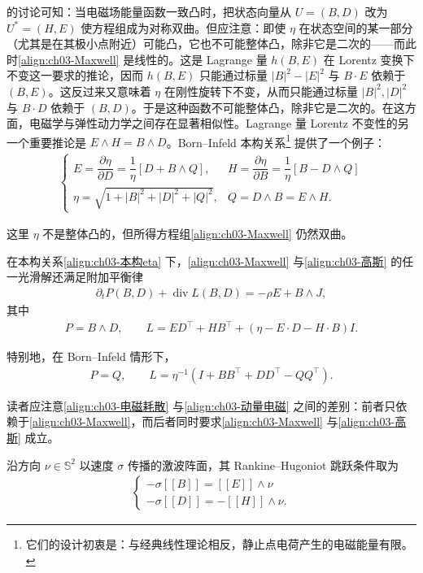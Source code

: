 ﻿\documentclass[../../main.tex]{subfiles}
\begin{document}
的讨论可知：当电磁场能量函数一致凸时，把状态向量从 $U=(B,D)$ 改为 $U^{*}=(H,E)$ 使方程组成为对称双曲。但应注意：即使 $\eta$ 在状态空间的某一部分（尤其是在其极小点附近）可能凸，它也不可能整体凸，除非它是二次的——而此时\eqref{align:ch03-Maxwell} 是线性的。这是 Lagrange 量 $h(B,E)$ 在 Lorentz 变换下不变这一要求的推论，因而 $h(B,E)$ 只能通过标量 $|B|^{2}-|E|^{2}$ 与 $B\cdot E$ 依赖于 $(B,E)$。这反过来又意味着 $\eta$ 在刚性旋转下不变，从而只能通过标量 $|B|^{2},|D|^{2}$ 与 $B\cdot D$ 依赖于 $(B,D)$。于是这种函数不可能整体凸，除非它是二次的。在这方面，电磁学与弹性动力学之间存在显著相似性。Lagrange 量 Lorentz 不变性的另一个重要推论是 $E\wedge H=B\wedge D$。Born--Infeld 本构关系\footnote{它们的设计初衷是：与经典线性理论相反，静止点电荷产生的电磁能量有限。} 提供了一个例子：
\begin{align}
\begin{cases}
E=\dfrac{\partial\eta}{\partial D}=\dfrac{1}{\eta}[D+B\wedge Q], & H=\dfrac{\partial\eta}{\partial B}=\dfrac{1}{\eta}[B-D\wedge Q]\\
\eta=\sqrt{1+|B|^{2}+|D|^{2}+|Q|^{2}}, & Q=D\wedge B=E\wedge H.
\end{cases}
\label{align:ch03-BornInfeld}
\end{align}

这里 $\eta$ 不是整体凸的，但所得方程组\eqref{align:ch03-Maxwell} 仍然双曲。

在本构关系\eqref{align:ch03-本构eta} 下，\eqref{align:ch03-Maxwell} 与\eqref{align:ch03-高斯} 的任一光滑解还满足附加平衡律
\begin{align}
\partial_{t}P(B,D)+\operatorname{div}L(B,D)=-\rho E+B\wedge J,
\label{align:ch03-动量电磁}
\end{align}
其中
\begin{align}
P=B\wedge D,\qquad L=ED^{\top}+HB^{\top}+(\eta-E\cdot D-H\cdot B)I.
\label{align:ch03-PL}
\end{align}

特别地，在 Born--Infeld 情形下，
\begin{align}
P=Q,\qquad L=\eta^{-1}\left(I+BB^{\top}+DD^{\top}-QQ^{\top}\right).
\label{align:ch03-BI-PL}
\end{align}

读者应注意\eqref{align:ch03-电磁耗散} 与\eqref{align:ch03-动量电磁} 之间的差别：前者只依赖于\eqref{align:ch03-Maxwell}，而后者同时要求\eqref{align:ch03-Maxwell} 与\eqref{align:ch03-高斯} 成立。

沿方向 $\nu\in\mathbb{S}^{2}$ 以速度 $\sigma$ 传播的激波阵面，其 Rankine--Hugoniot 跳跃条件取为
\begin{align}
\begin{cases}
-\sigma[\![B]\!]=[\![E]\!]\wedge\nu\\
-\sigma[\![D]\!]=-[\![H]\!]\wedge\nu.
\end{cases}
\label{align:ch03-电磁RH}
\end{align}
\end{document}

